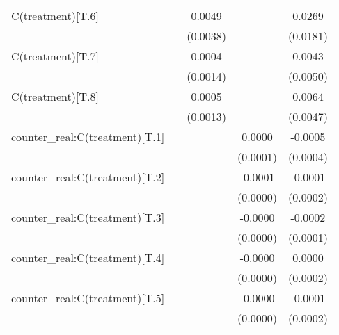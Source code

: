 \begin{table}
\begin{center}
\begin{tabular}{lcccc}
C(treatment)[T.6]               &                    & 0.0049              &                      & 0.0269                 \\
                                &                    & (0.0038)            &                      & (0.0181)               \\
C(treatment)[T.7]               &                    & 0.0004              &                      & 0.0043                 \\
                                &                    & (0.0014)            &                      & (0.0050)               \\
C(treatment)[T.8]               &                    & 0.0005              &                      & 0.0064                 \\
                                &                    & (0.0013)            &                      & (0.0047)               \\
counter\_real:C(treatment)[T.1] &                    &                     & 0.0000               & -0.0005                \\
                                &                    &                     & (0.0001)             & (0.0004)               \\
counter\_real:C(treatment)[T.2] &                    &                     & -0.0001              & -0.0001                \\
                                &                    &                     & (0.0000)             & (0.0002)               \\
counter\_real:C(treatment)[T.3] &                    &                     & -0.0000              & -0.0002                \\
                                &                    &                     & (0.0000)             & (0.0001)               \\
counter\_real:C(treatment)[T.4] &                    &                     & -0.0000              & 0.0000                 \\
                                &                    &                     & (0.0000)             & (0.0002)               \\
counter\_real:C(treatment)[T.5] &                    &                     & -0.0000              & -0.0001                \\
                                &                    &                     & (0.0000)             & (0.0002)               \\

\end{tabular}
\end{center}
\end{table}
